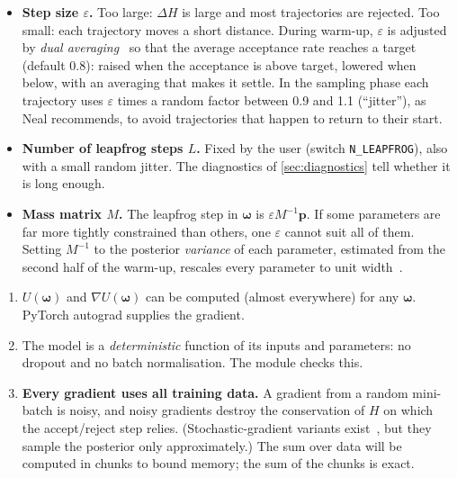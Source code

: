 \documentclass[11pt]{article}
\newcommand{\code}[1]{\texttt{#1}}
\newcommand{\bw}{\boldsymbol{\omega}}
\newcommand{\bp}{\boldsymbol{p}}
\begin{document}
\begin{itemize}
  \item \textbf{Step size $\varepsilon$.} Too large: $\Delta H$ is large and most
    trajectories are rejected. Too small: each trajectory moves a short distance.
    During warm-up, $\varepsilon$ is adjusted by \emph{dual averaging}~\cite{hoffman2014}
    so that the average acceptance rate reaches a target (default 0.8): raised when
    the acceptance is above target, lowered when below, with an averaging that makes
    it settle. In the sampling phase each trajectory uses $\varepsilon$ times a random
    factor between 0.9 and 1.1 (``jitter''), as Neal recommends, to avoid trajectories
    that happen to return to their start.
  \item \textbf{Number of leapfrog steps $L$.} Fixed by the user (switch
    \code{N\_LEAPFROG}), also with a small random jitter. The diagnostics of
    \cref{sec:diagnostics} tell whether it is long enough.
  \item \textbf{Mass matrix $M$.} The leapfrog step in $\bw$ is $\varepsilon M^{-1}\bp$.
    If some parameters are far more tightly constrained than others, one $\varepsilon$
    cannot suit all of them. Setting $M^{-1}$ to the posterior \emph{variance} of each
    parameter, estimated from the second half of the warm-up, rescales every parameter
    to unit width~\cite{neal2011}. 
\end{itemize}

\begin{assume}
\begin{enumerate}
  \item $U(\bw)$ and $\nabla U(\bw)$ can be computed (almost everywhere) for any $\bw$.
    PyTorch autograd supplies the gradient.
  \item The model is a \emph{deterministic} function of its inputs and parameters:
    no dropout and no batch normalisation. The module checks this.
  \item \textbf{Every gradient uses all training data.} A gradient from a random
    mini-batch is noisy, and noisy gradients destroy the conservation of $H$ on which
    the accept/reject step relies. (Stochastic-gradient variants exist~\cite{chen2014},
    but they sample the posterior only approximately.)
    The sum over data will be computed in chunks to bound memory; the sum of the
    chunks is exact.
\end{enumerate}
\end{assume}
\end{document}
